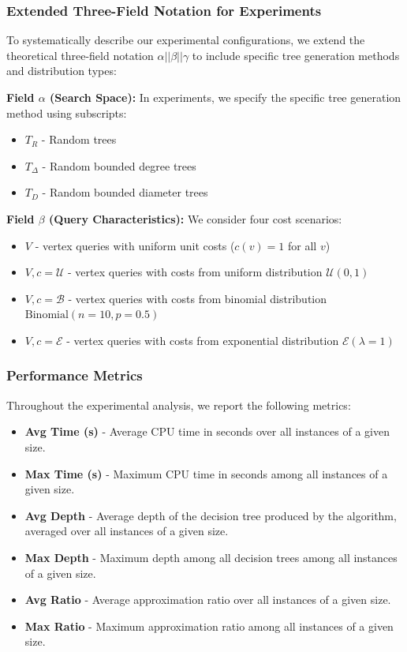 \subsubsection*{Extended Three-Field Notation for Experiments}

To systematically describe our experimental configurations, we extend the theoretical three-field notation $\alpha || \beta || \gamma$ to include specific tree generation methods and distribution types:

\textbf{Field $\alpha$ (Search Space):} In experiments, we specify the specific tree generation method using subscripts:
\begin{itemize}
    \item $T_R$ - Random trees
    \item $T_{\Delta}$ - Random bounded degree trees
    \item $T_D$ - Random bounded diameter trees
\end{itemize}

\textbf{Field $\beta$ (Query Characteristics):} 
We consider four cost scenarios:
\begin{itemize}
    \item $V$ - vertex queries with uniform unit costs ($c(v) = 1$ for all $v$)
    \item $V, c = \mathcal{U}$ - vertex queries with costs from uniform distribution $\mathcal{U}(0,1)$
    \item $V, c = \mathcal{B}$ - vertex queries with costs from binomial distribution $\text{Binomial}(n=10, p=0.5)$
    \item $V, c = \mathcal{E}$ - vertex queries with costs from exponential distribution $\mathcal{E}(\lambda=1)$
\end{itemize}

\subsubsection*{Performance Metrics}

Throughout the experimental analysis, we report the following metrics:

\begin{itemize}
    \item \textbf{Avg Time (s)} - Average CPU time in seconds over all instances of a given size.
    \item \textbf{Max Time (s)} - Maximum CPU time in seconds among all instances of a given size. 
    \item \textbf{Avg Depth} - Average depth of the decision tree produced by the algorithm, averaged over all instances of a given size.
    \item \textbf{Max Depth} - Maximum depth among all decision trees among all instances of a given size.
    \item \textbf{Avg Ratio} - Average approximation ratio over all instances of a given size.
    \item \textbf{Max Ratio} - Maximum approximation ratio among all instances of a given size.
\end{itemize}
